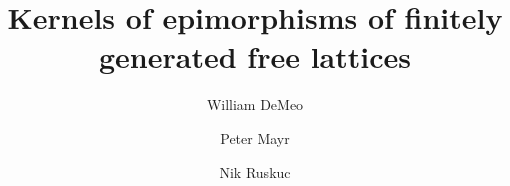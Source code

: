 \usepackage{pdfcomment}
\usepackage{color}
\usepackage{amsmath}
\usepackage{amssymb}
\usepackage{amsfonts}
\usepackage{mathtools}
\usepackage{amscd}
\usepackage{inputs/wjdlatexmacs}

\usepackage[mathcal]{euscript}
\usepackage{comment}
\usepackage{tikz}
\usetikzlibrary{math} %

\renewcommand{\th}[2]{#1\mathrel{\theta}#2}
\newcommand{\infixrel}[3]{#2\mathrel{#1}#3}


\newtheorem{theorem}{Theorem}
\newtheorem{lemma}[theorem]{Lemma}
\newtheorem{corollary}[theorem]{Corollary}
\newtheorem{prop}[theorem]{Proposition}
\newtheorem{conjecture}[theorem]{Conjecture}
\theoremstyle{definition}
\newtheorem{definition}[theorem]{Definition}
\newtheorem{example}[theorem]{Example}
\newtheorem{fact}[theorem]{Fact}
\newtheorem{remark}{Remark}
\newtheorem*{remarks}{Remarks}
\newtheorem*{rem}{Remark}
\newtheorem{prob}{Problem}



\title[Kernels of Lattice Epimorphisms]{Kernels of epimorphisms of finitely generated free lattices}
\author[W.~DeMeo]{William DeMeo}

\author[P.~Mayr]{Peter Mayr}

\author[N.~Ruskuc]{Nik Ruskuc}

